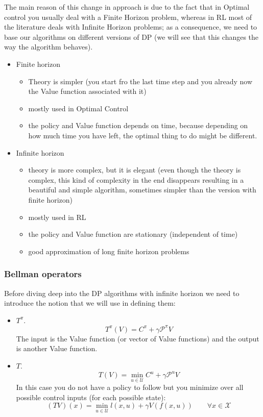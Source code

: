 The main reason of this change in approach is due to the fact that in Optimal control you usually deal with a Finite Horizon problem, whereas in RL most of the literature deals with Infinite Horizon problems; as a consequence, we need to base our algorithms on different versions of DP (we will see that this changes the way the algorithm behaves).

\begin{itemize}
\item Finite horizon
\begin{itemize}
\item Theory is simpler (you start fro the last time step and you already now the Value function associated with it)
\item mostly used in Optimal Control
\item the policy and Value function depends on time, because depending on how much time you have left, the optimal thing to do might be different.
\end{itemize}
\item Infinite horizon
\begin{itemize}
\item theory is more complex, but it is elegant (even though the theory is complex, this kind of complexity in the end disappears resulting in a beautiful and simple algorithm, sometimes simpler than the version with finite horizon)
\item mostly used in RL
\item the policy and Value function are stationary (independent of time)
\item good approximation of long finite horizon problems
\end{itemize}
\end{itemize}

\subsubsection{Bellman operators}
Before diving deep into the DP algorithms with infinite horizon we need to introduce the notion that we will use in defining them:
\begin{itemize}
\item {} $T^{\pi}$.
\[T^{\pi}(V) = C^{\pi} + \gamma\mathcal{P}^{\pi}V\]
The input is the Value function (or vector of Value functions) and the output is another Value function.
\item {} $T$.
\[T(V) = \min_{u\in\mathcal{U}} C^u + \gamma\mathcal{P}^uV\]
In this case you do not have a policy to follow but you minimize over all possible control inputs (for each possible state):
\[(TV)(x) = \min_{u\in\mathcal{U}} l(x,u) + \gamma V(f(x,u))\qquad\forall x \in \mathcal{X}\]
\end{itemize}

